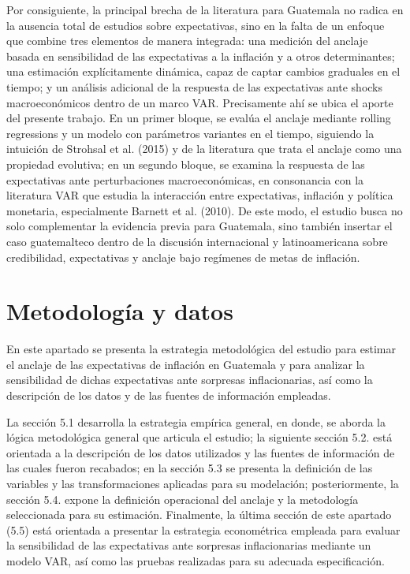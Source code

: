 \documentclass[
  10.5pt,
  letterpaper,
  twocolumn]{article}
\begin{document}
Por consiguiente, la principal brecha de la literatura para Guatemala no
radica en la ausencia total de estudios sobre expectativas, sino en la
falta de un enfoque que combine tres elementos de manera integrada: una
medición del anclaje basada en sensibilidad de las expectativas a la
inflación y a otros determinantes; una estimación explícitamente
dinámica, capaz de captar cambios graduales en el tiempo; y un análisis
adicional de la respuesta de las expectativas ante shocks
macroeconómicos dentro de un marco VAR. Precisamente ahí se ubica el
aporte del presente trabajo. En un primer bloque, se evalúa el anclaje
mediante rolling regressions y un modelo con parámetros variantes en el
tiempo, siguiendo la intuición de Strohsal et al. (2015) y de la
literatura que trata el anclaje como una propiedad evolutiva; en un
segundo bloque, se examina la respuesta de las expectativas ante
perturbaciones macroeconómicas, en consonancia con la literatura VAR que
estudia la interacción entre expectativas, inflación y política
monetaria, especialmente Barnett et al. (2010). De este modo, el estudio
busca no solo complementar la evidencia previa para Guatemala, sino
también insertar el caso guatemalteco dentro de la discusión
internacional y latinoamericana sobre credibilidad, expectativas y
anclaje bajo regímenes de metas de inflación.

\section{Metodología y datos}\label{metodologuxeda-y-datos}

En este apartado se presenta la estrategia metodológica del estudio para
estimar el anclaje de las expectativas de inflación en Guatemala y para
analizar la sensibilidad de dichas expectativas ante sorpresas
inflacionarias, así como la descripción de los datos y de las fuentes de
información empleadas.

La sección 5.1 desarrolla la estrategia empírica general, en donde, se
aborda la lógica metodológica general que articula el estudio; la
siguiente sección 5.2. está orientada a la descripción de los datos
utilizados y las fuentes de información de las cuales fueron recabados;
en la sección 5.3 se presenta la definición de las variables y las
transformaciones aplicadas para su modelación; posteriormente, la
sección 5.4. expone la definición operacional del anclaje y la
metodología seleccionada para su estimación. Finalmente, la última
sección de este apartado (5.5) está orientada a presentar la estrategia
econométrica empleada para evaluar la sensibilidad de las expectativas
ante sorpresas inflacionarias mediante un modelo VAR, así como las
pruebas realizadas para su adecuada especificación.
\end{document}
